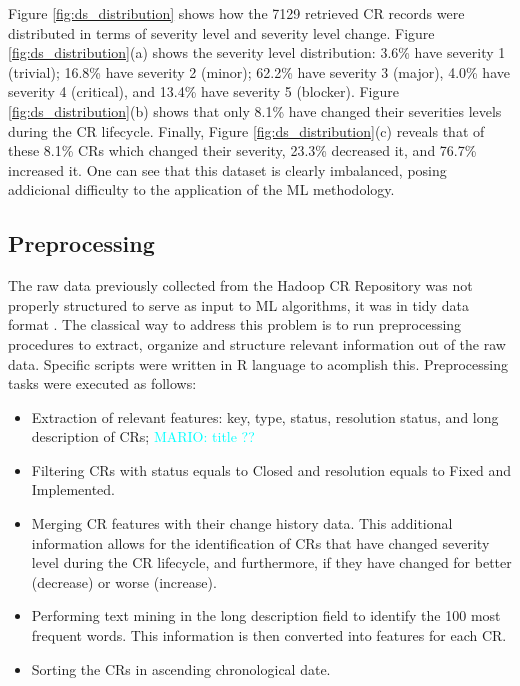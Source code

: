 \documentclass[10pt, conference]{IEEEtran}
\newcommand{\mario}[1]{\noindent\textcolor{cyan}{MARIO: {#1}}}
\newcommand{\mario}[1]{}
\begin{document}
Figure \ref{fig:ds_distribution} shows how the 7129 retrieved CR records were distributed in terms of severity level and severity level change. Figure \ref{fig:ds_distribution}(a) shows the severity level distribution: 3.6\% have severity 1 (trivial); 16.8\% have severity 2 (minor); 62.2\% have severity 3 (major), 4.0\% have severity 4 (critical), and 13.4\% have severity 5 (blocker). Figure \ref{fig:ds_distribution}(b) shows that only 8.1\% have changed their severities levels during the CR lifecycle. Finally, Figure \ref{fig:ds_distribution}(c) reveals that of these 8.1\% CRs which changed their severity, 23.3\% decreased it, and 76.7\% increased it. One can see that this dataset is clearly imbalanced, posing addicional difficulty to the application of the ML methodology. 

\subsection{Preprocessing} 	\label{subsec:preprocessing}

The raw data previously collected from the Hadoop CR Repository was not properly structured to serve as input to ML algorithms, it was in tidy data format \cite{DeJonge2013}. The classical way to address this problem is to run preprocessing procedures to extract, organize and structure relevant information out of the raw data. Specific scripts were written in R language to acomplish this. Preprocessing tasks were executed as follows:  

\begin{itemize}
 \item Extraction of relevant features: key, type, status, resolution status, and long description of CRs; \mario{title ??}
 \item Filtering CRs with status equals to Closed and resolution equals to Fixed and Implemented. 
 \item Merging CR features with their change history data. This additional information allows for the identification of CRs that have changed severity level during the CR lifecycle, and furthermore, if they have changed for better (decrease) or worse (increase).
 \item Performing text mining in the long description field to identify the 100 most frequent words. This information is then converted into features for each CR.
 \item Sorting the CRs in ascending chronological date. 
\end{itemize}
\end{document}
